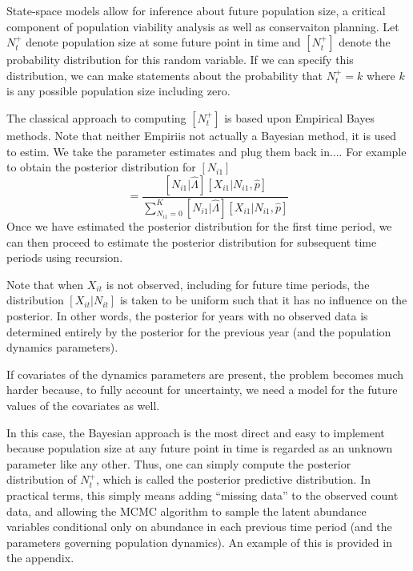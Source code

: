 \documentclass[12pt]{article}
\begin{document}
State-space models allow for inference about future population size,
a critical component of population viability analysis as well
as conservaiton planning. Let $N^+_{t}$ denote population size at some
future point in time and $[N^+_t]$ denote the probability
distribution for this random variable. If we can specify this
distribution, we can make statements about the
probability that $N^+_t = k$ where $k$ is any possible population size
including zero.

The classical approach to computing $[N^+_t]$ is based upon Empirical
Bayes methods. Note that neither Empiriis not actually a Bayesian
method, it is used to estim.
We take the parameter estimates and plug them back in.... For example
to obtain the posterior distribution for $[N_{i1}]$
\begin{equation}
  [\hat{N}_{i1}] = \frac{[N_{i1}|\hat{\Lambda}][X_{i1}|N_{i1}, \hat{p}]}{\sum_{N_{i1}=0}^K [N_{i1}|\hat{\Lambda}][X_{i1}|N_{i1},\hat{p}]}
  \label{eq:3}
\end{equation}
Once we have estimated the posterior distribution for the first time
period, we can then proceed to estimate the posterior distribution for
subsequent time periods using recursion.

Note that when $X_{it}$ is not observed, including for future time
periods, the distribution $[X_{it}|N_{it}]$ is taken to be uniform
such that it has no influence on the posterior. In other words, the
posterior for years with no observed data is determined entirely by
the posterior for the previous year (and the population dynamics
parameters).

If covariates of the dynamics parameters are present, the problem
becomes much harder because, to fully account for uncertainty, we need
a model for the future values of the covariates as well.

In this case, the Bayesian approach is the most direct and easy to
implement because population size at any future point in time is
regarded as an unknown parameter like any other. Thus, one can simply
compute the posterior distribution of $N^+_t$, which is called the
posterior predictive distribution. In practical terms, this simply
means adding ``missing data'' to the observed count data, and allowing
the MCMC algorithm to sample the latent abundance variables
conditional only on abundance in each previous time period (and the
parameters governing population dynamics). An example of this is
provided in the appendix.
\end{document}
